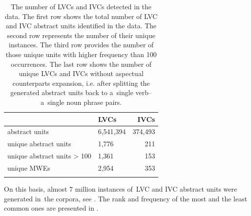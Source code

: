 \documentclass[output=paper,modfonts,nonflat]{langsci/langscibook}
\begin{document}
\begin{table}[p]
\caption{The number of LVCs and IVCs detected in the data. The first row shows 
the total number of LVC and IVC abstract units identified in the data. The second 
row represents the number of their unique instances. The third row provides the 
number of those unique units with higher frequency than 100 occurrences. The 
last row shows the number of unique LVCs and IVCs without aspectual 
counterparts expansion, i.e. after splitting the generated abstract units back 
to a~single verb--a~single noun phrase pairs.}

\label{data_preprocessing}
\begin{tabularx}{.8\textwidth}{XYr}
\lsptoprule        & LVCs        & IVCs \\ 
\midrule
abstract units     & 6,541,394   & 374,493    \\ %
unique abstract units       & 1,776       &  211    \\ %
unique abstract units > 100 & 1,361       &  153    \\ %
unique MWEs        & 2,954       & 353    \\
\lspbottomrule
\end{tabularx}
\end{table}


\largerpage
On this basis, almost 7 million instances of~LVC and IVC abstract units were 
generated in~the corpora, see . The rank and 
frequency of the most and the least common ones are presented in 
.
\end{document}
